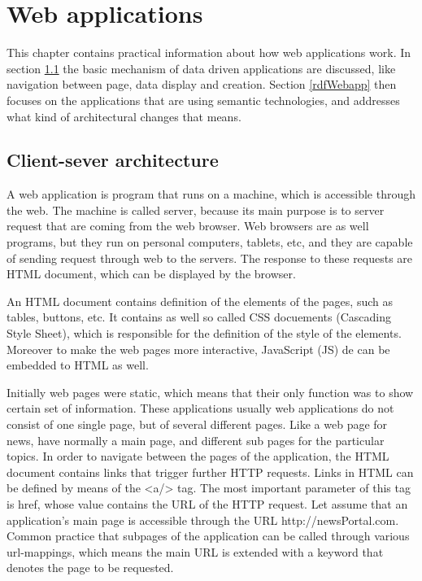 \section{Web applications}

This chapter contains practical information about how web applications work. In section \ref{clientServer} the basic mechanism of data driven applications are discussed, like navigation between page, data display and creation. Section \ref{rdfWebapp} then focuses on the applications that are using semantic technologies, and addresses what kind of architectural changes that means.

\subsection{Client-sever architecture} \label{clientServer}


A web application is program that runs on a machine, which is accessible through the web. The machine is called server, because its main purpose is to server request that are coming from the web browser. Web browsers are as well programs, but they run on personal computers, tablets, etc, and they are capable of sending request through web to the servers. The response to these requests are HTML document, which can be displayed by the browser. 



An HTML document contains definition of the elements of the pages, such as tables, buttons, etc. It contains as well so called CSS docuements (Cascading Style Sheet), which is responsible for the definition of the style of the elements. Moreover to make the web pages more interactive, JavaScript (JS) de can be embedded to HTML as well. 


Initially web pages were static, which means that their only function was to show certain set of information. These applications usually web applications do not consist of one single page, but of several different pages. Like a web page for news, have normally a main page, and different sub pages for the particular topics. In order to navigate between the pages of the application, the HTML document contains links that trigger further HTTP requests. Links in HTML can be defined by means of the <a/> tag.  The most important parameter of this tag is href, whose value contains the URL of the HTTP request. Let assume that an application’s main page is accessible through the URL http://newsPortal.com. Common practice that subpages of the application can be called through various url-mappings, which means the main URL is extended with a keyword that denotes the page to be requested. 

